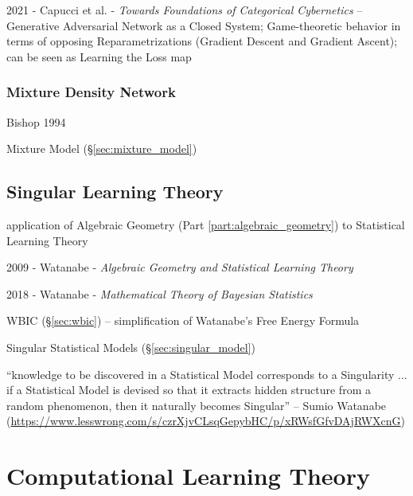 2021 - Capucci et al. - \emph{Towards Foundations of Categorical Cybernetics} --
Generative Adversarial Network as a Closed System; Game-theoretic behavior in
terms of opposing Reparametrizations (Gradient Descent and Gradient Ascent); can
be seen as Learning the Loss map



\subsubsection{Mixture Density Network}\label{sec:mixture_density_network}

Bishop 1994

Mixture Model (\S\ref{sec:mixture_model})



\subsection{Singular Learning Theory}\label{sec:singular_learning}

application of Algebraic Geometry (Part \ref{part:algebraic_geometry}) to
Statistical Learning Theory

2009 - Watanabe - \emph{Algebraic Geometry and Statistical Learning Theory}

2018 - Watanabe - \emph{Mathematical Theory of Bayesian Statistics}

WBIC (\S\ref{sec:wbic}) -- simplification of Watanabe's Free Energy Formula

\fist Singular Statistical Models (\S\ref{sec:singular_model})

``knowledge to be discovered in a Statistical Model corresponds to a
Singularity ... if a Statistical Model is devised so that it extracts hidden
structure from a random phenomenon, then it naturally becomes Singular'' --
Sumio Watanabe
(\url{https://www.lesswrong.com/s/czrXjvCLsqGepybHC/p/xRWsfGfvDAjRWXcnG})



\section{Computational Learning Theory}\label{sec:computational_learning_theory}

